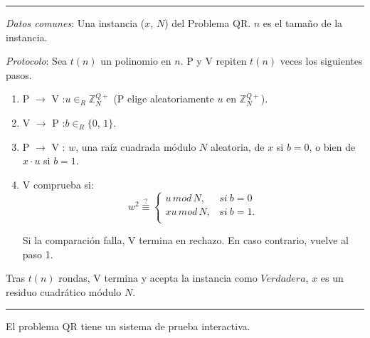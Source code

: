 \hfil

\rule{\textwidth}{1pt}
\begin{algorithm}
	
	\hfil
	
	\textit{Datos comunes}: Una instancia ($x$, $N$) del Problema QR. $n$ es el tamaño de la instancia.
	
	\textit{Protocolo}: Sea $t(n)$ un polinomio en $n$. P y V repiten $t(n)$ veces los siguientes pasos.
	
	\begin{enumerate}
		
		\item P $\rightarrow$ V :\quad $u \in_R \mathbb{Z}^{Q+}_N$ \quad (P elige aleatoriamente $u$ en $\mathbb{Z}^{Q+}_N$).
		
		\item V $\rightarrow$ P :\quad $b \in_R \{0,\,1\}$.
		
		\item P $\rightarrow$ V :\; $w$,\; una raíz cuadrada módulo $N$ aleatoria, de $x$ si $b=0$, o bien de $x\cdot u$ si $b=1$.
		
		\item V comprueba si:
		\[
			w^2 \overset{?}{\equiv}
			\begin{cases}
				u\, mod\, N, & si\ b = 0\\
				xu\, mod\, N, & si\ b = 1.\\
			\end{cases}
		\]
		
		Si la comparación falla, V termina en rechazo. En caso contrario, vuelve al paso 1.
		
		
	\end{enumerate}

	Tras $t(n)$ rondas, V termina y acepta la instancia como $Verdadera$, $x$ es un residuo cuadrático módulo $N$.
	
	\label{QRinteractive:alg}
\end{algorithm}
\rule{\textwidth}{1pt}

\hfil


\begin{theorem}
	El problema QR tiene un sistema de prueba interactiva.
	\label{theo:QRint}
\end{theorem}

